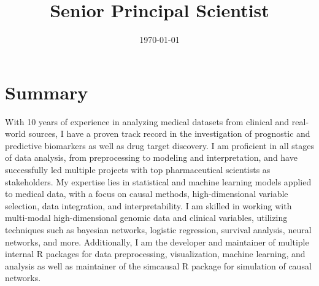 \documentclass{moderncv}
\date{\today}
\title{Senior Principal Scientist}
\begin{document}
\maketitle


\section{Summary}
\label{sec:org58f357a}
With 10 years of experience in analyzing medical datasets from clinical and real-world sources, I have a proven track record in the investigation of prognostic and predictive biomarkers as well as drug target discovery. I am proficient in all stages of data analysis, from preprocessing to modeling and interpretation, and have successfully led multiple projects with top pharmaceutical scientists as stakeholders. My expertise lies in statistical and machine learning models applied to medical data, with a focus on causal methods, high-dimensional variable selection, data integration, and interpretability. I am skilled in working with multi-modal high-dimensional genomic data and clinical variables, utilizing techniques such as bayesian networks, logistic regression, survival analysis, neural networks, and more. Additionally, I am the developer and maintainer of multiple internal R packages for data preprocessing, visualization, machine learning, and analysis as well as maintainer of the simcausal R package for simulation of causal networks.
\end{document}
